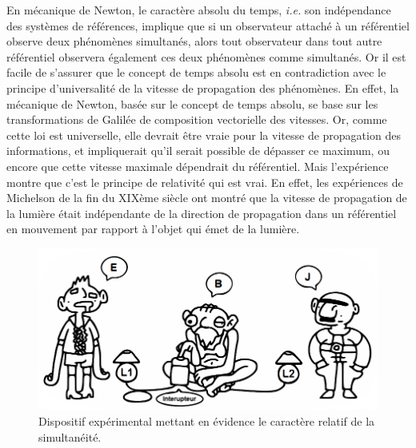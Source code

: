 		En mécanique de Newton, le caractère absolu du temps, \emph{i.e.} son indépendance des systèmes de références, implique que si un observateur attaché à un référentiel observe deux phénomènes simultanés, alors tout observateur dans tout autre référentiel observera également ces deux phénomènes comme simultanés. Or il est facile de s'assurer que le concept de temps absolu est en contradiction avec le principe d'universalité de la vitesse de propagation des phénomènes. En effet, la mécanique de Newton, basée sur le concept de temps absolu, se base sur les transformations de Galilée de composition vectorielle des vitesses. Or, comme cette loi est universelle, elle devrait être vraie pour la vitesse de propagation des informations, et impliquerait qu'il serait possible de dépasser ce maximum, ou encore que cette vitesse maximale dépendrait du référentiel. Mais l'expérience montre que c'est le principe de relativité qui est vrai. En effet, les expériences de Michelson de la fin du XIXème siècle ont montré que la vitesse de propagation de la lumière était indépendante de la direction de propagation dans un référentiel en mouvement par rapport à l'objet qui émet de la lumière. 

		\begin{figure}
			\centering
			\includegraphics[scale=0.4]{../cours/la_science_pour_les_basios_by_eurydrama.png}
			\caption{Dispositif expérimental mettant en évidence le caractère relatif de la simultanéité.}
			\label{pluthaar}
		\end{figure}

